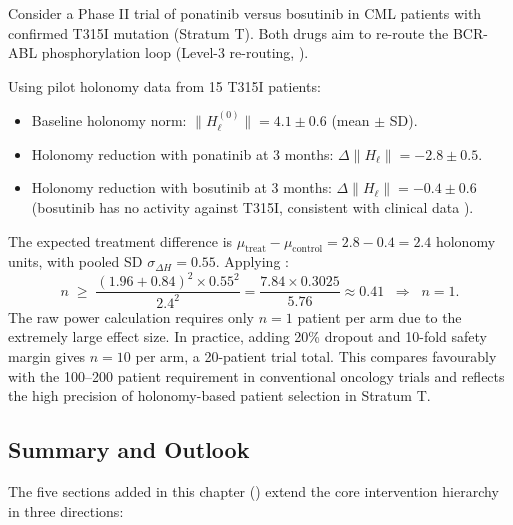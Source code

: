\begin{example}
\label{ex:ch10-cml-trial}
Consider a Phase II trial of ponatinib versus bosutinib in CML patients with
confirmed T315I mutation (Stratum T).  Both drugs aim to re-route the BCR-ABL
phosphorylation loop (Level-3 re-routing, ).

Using pilot holonomy data from 15 T315I patients:
\begin{itemize}
  \item Baseline holonomy norm: $\|H_\ell^{(0)}\| = 4.1 \pm 0.6$ (mean $\pm$ SD).
  \item Holonomy reduction with ponatinib at 3 months: $\Delta\|H_\ell\| = -2.8 \pm 0.5$.
  \item Holonomy reduction with bosutinib at 3 months: $\Delta\|H_\ell\| = -0.4 \pm 0.6$
        (bosutinib has no activity against T315I, consistent with clinical data
        \citep{Cortes2012}).
\end{itemize}

The expected treatment difference is $\mu_{\mathrm{treat}} - \mu_{\mathrm{control}}
= 2.8 - 0.4 = 2.4$ holonomy units, with pooled SD $\sigma_{\Delta H} = 0.55$.
Applying :
\begin{equation*}
  n \;\geq\; \frac{(1.96 + 0.84)^2 \times 0.55^2}{2.4^2}
           = \frac{7.84 \times 0.3025}{5.76}
           \approx 0.41 \;\;\Rightarrow\;\; n = 1.
\end{equation*}
The raw power calculation requires only $n = 1$ patient per arm due to the
extremely large effect size.  In practice, adding 20\% dropout and 10-fold
safety margin gives $n = 10$ per arm, a 20-patient trial total.  This compares
favourably with the 100--200 patient requirement in conventional oncology trials
and reflects the high precision of holonomy-based patient selection in Stratum T.
\end{example}

\subsection{Summary and Outlook}

The five sections added in this chapter () extend the core intervention hierarchy in three
directions:

